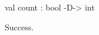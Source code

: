 \runverbatimtrue
{}
\begin{RunVerbatimMsg}
val count : bool -D-> int
\end{RunVerbatimMsg}
\begin{RunVerbatimErr}
Success.
\end{RunVerbatimErr}
